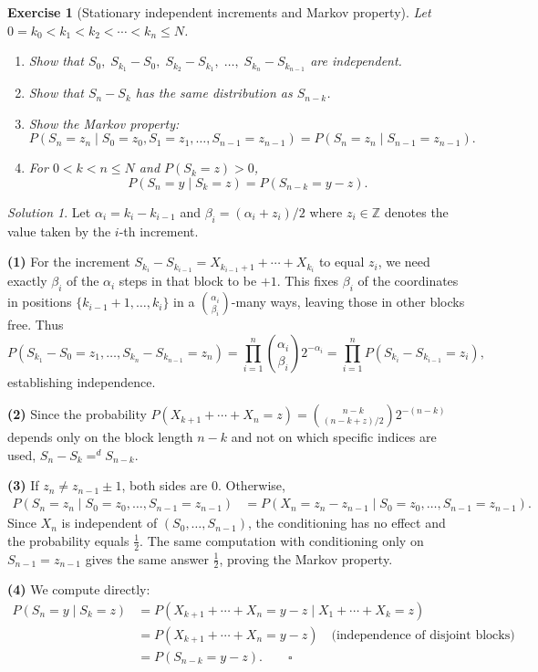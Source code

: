 \documentclass[12pt]{article}
\newtheorem{exercise}{Exercise}
\theoremstyle{remark}
\newtheorem*{solution}{Solution}
\begin{document}
\begin{exercise}[Stationary independent increments and Markov property]
Let $0 = k_0 < k_1 < k_2 < \cdots < k_n \le N$.
\begin{enumerate}
  \item[(1)] Show that $S_0,\; S_{k_1}-S_0,\; S_{k_2}-S_{k_1},\; \ldots,\; S_{k_n}-S_{k_{n-1}}$
             are independent.
  \item[(2)] Show that $S_n - S_k$ has the same distribution as $S_{n-k}$.
  \item[(3)] Show the Markov property:
             \[
               P(S_n = z_n \mid S_0=z_0, S_1=z_1, \ldots, S_{n-1}=z_{n-1})
               = P(S_n = z_n \mid S_{n-1} = z_{n-1}).
             \]
  \item[(4)] For $0 < k < n \le N$ and $P(S_k = z) > 0$,
             \[
               P(S_n = y \mid S_k = z) = P(S_{n-k} = y - z).
             \]
\end{enumerate}
\end{exercise}

\begin{solution}
Let $\alpha_i = k_i - k_{i-1}$ and $\beta_i = (\alpha_i + z_i)/2$ where
$z_i \in \mathbb{Z}$ denotes the value taken by the $i$-th increment.

\textbf{(1)} For the increment $S_{k_i} - S_{k_{i-1}} = X_{k_{i-1}+1} + \cdots + X_{k_i}$
to equal $z_i$, we need exactly $\beta_i$ of the $\alpha_i$ steps in that block to be $+1$.
This fixes $\beta_i$ of the coordinates in positions $\{k_{i-1}+1, \ldots, k_i\}$ in a
$\binom{\alpha_i}{\beta_i}$-many ways, leaving those in other blocks free.  Thus
\[
  P(S_{k_1}-S_0 = z_1, \ldots, S_{k_n}-S_{k_{n-1}}=z_n)
  = \prod_{i=1}^n \binom{\alpha_i}{\beta_i} 2^{-\alpha_i}
  = \prod_{i=1}^n P(S_{k_i} - S_{k_{i-1}} = z_i),
\]
establishing independence.

\textbf{(2)} Since the probability $P(X_{k+1}+\cdots+X_n = z) = \binom{n-k}{(n-k+z)/2} 2^{-(n-k)}$
depends only on the block length $n-k$ and not on which specific indices are used,
$S_n - S_k =^d S_{n-k}$.

\textbf{(3)} If $z_n \ne z_{n-1} \pm 1$, both sides are $0$. Otherwise,
\begin{align*}
  P(S_n=z_n \mid S_0=z_0,\ldots,S_{n-1}=z_{n-1})
  &= P(X_n = z_n - z_{n-1} \mid S_0=z_0,\ldots,S_{n-1}=z_{n-1}).
\end{align*}
Since $X_n$ is independent of $(S_0,\ldots,S_{n-1})$, the conditioning has no effect and
the probability equals $\tfrac{1}{2}$.  The same computation with conditioning only on
$S_{n-1}=z_{n-1}$ gives the same answer $\tfrac{1}{2}$, proving the Markov property.

\textbf{(4)} We compute directly:
\begin{align*}
  P(S_n=y \mid S_k=z)
  &= P(X_{k+1}+\cdots+X_n = y-z \mid X_1+\cdots+X_k = z) \\
  &= P(X_{k+1}+\cdots+X_n = y-z)  \quad \text{(independence of disjoint blocks)} \\
  &= P(S_{n-k} = y-z). \qquad \square
\end{align*}
\end{solution}
\end{document}
